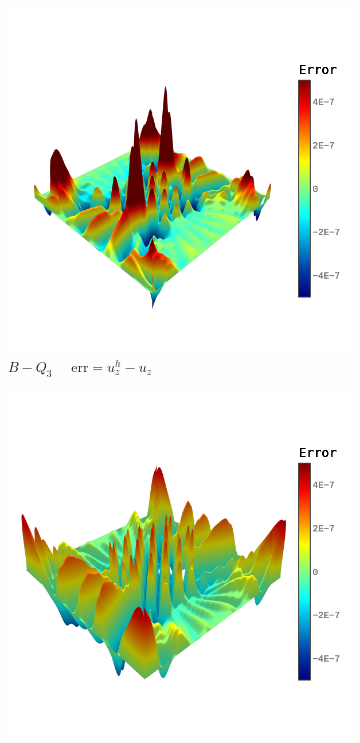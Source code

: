 \begin{figure}[H]
	\center
	\captionsetup[subfigure]{labelformat=empty}
	\begin{subfigure}[t]{.45\linewidth}
		\center
		\includegraphics[scale=.3,trim={0cm 1.5cm 0cm 1.5cm},clip]{e_d}
		\caption{$B-Q_3$ $\quad \text{err} = u_z^h-u_z$}
	\end{subfigure}
	\begin{subfigure}[t]{.45\linewidth}
		\center
		\includegraphics[scale=.3,trim={0cm 1.5cm 0cm 1.5cm},clip]{g_d}

\end{subfigure}
\end{figure}
